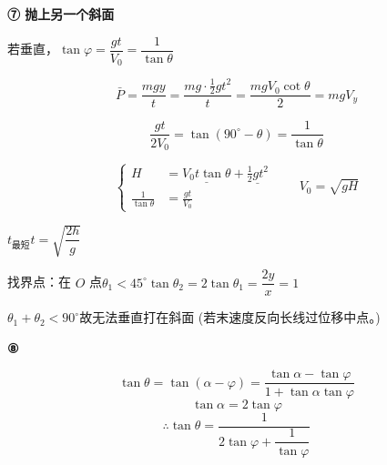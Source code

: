 \textbf{⑦ 抛上另一个斜面}

\noindent 若垂直，$\tan\varphi=\dfrac{gt}{V_0}=\dfrac{1}{\tan\theta}$

\[
\bar P=\frac{mgy}{t}=\frac{mg\cdot\frac12gt^2}{t}=\frac{mgV_0\cot\theta}{2}=mgV_y
\]%

\[
\frac{gt}{2V_0}=\tan(90^\circ-\theta)=\frac{1}{\tan\theta}
\]

\[
\left\{\begin{aligned}
H&=\underline{V_0t\tan\theta}+\underline{\tfrac12gt^2}\\
\frac{1}{\tan\theta}&=\frac{gt}{V_0}
\end{aligned}\right.
\qquad V_0=\sqrt{gH}
\]%

\noindent $t_{\text{最短}}$\quad $t=\sqrt{\dfrac{2h}{g}}$

\noindent 找界点：在 $O$ 点\quad $\theta_1<45^\circ$\qquad $\tan\theta_2=2\tan\theta_1=\dfrac{2y}{x}=1$

\noindent $\theta_1+\theta_2<90^\circ$\qquad 故无法垂直打在斜面 (若末速度反向长线过位移中点。)%

\textbf{⑧}

\[
\tan\theta=\tan(\alpha-\varphi)=\frac{\tan\alpha-\tan\varphi}{1+\tan\alpha\tan\varphi}
\]
\[
\tan\alpha=2\tan\varphi
\]
\[
\therefore\tan\theta=\frac{1}{2\tan\varphi+\dfrac{1}{\tan\varphi}}
\]

